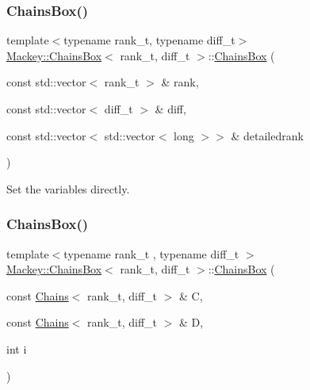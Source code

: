\subsubsection{\texorpdfstring{Chains\+Box()}{ChainsBox()}\hspace{0.1cm}{\footnotesize\ttfamily [2/4]}}
{\footnotesize\ttfamily template$<$typename rank\+\_\+t, typename diff\+\_\+t$>$ \\
\hyperlink{classMackey_1_1ChainsBox}{Mackey\+::\+Chains\+Box}$<$ rank\+\_\+t, diff\+\_\+t $>$\+::\hyperlink{classMackey_1_1ChainsBox}{Chains\+Box} (\begin{DoxyParamCaption}\item[{const std\+::vector$<$ rank\+\_\+t $>$ \&}]{rank,  }\item[{const std\+::vector$<$ diff\+\_\+t $>$ \&}]{diff,  }\item[{const std\+::vector$<$ std\+::vector$<$ long $>$$>$ \&}]{detailedrank }\end{DoxyParamCaption})\hspace{0.3cm}{\ttfamily [inline]}}



Set the variables directly. 

\mbox{\label{classMackey_1_1ChainsBox_a5ad9aaa3181850b3e297e698ea8eb39f}} 
\subsubsection{\texorpdfstring{Chains\+Box()}{ChainsBox()}\hspace{0.1cm}{\footnotesize\ttfamily [3/4]}}
{\footnotesize\ttfamily template$<$typename rank\+\_\+t , typename diff\+\_\+t $>$ \\
\hyperlink{classMackey_1_1ChainsBox}{Mackey\+::\+Chains\+Box}$<$ rank\+\_\+t, diff\+\_\+t $>$\+::\hyperlink{classMackey_1_1ChainsBox}{Chains\+Box} (\begin{DoxyParamCaption}\item[{const \hyperlink{classMackey_1_1Chains}{Chains}$<$ rank\+\_\+t, diff\+\_\+t $>$ \&}]{C,  }\item[{const \hyperlink{classMackey_1_1Chains}{Chains}$<$ rank\+\_\+t, diff\+\_\+t $>$ \&}]{D,  }\item[{int}]{i }\end{DoxyParamCaption})}



